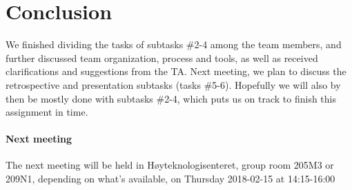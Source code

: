 \documentclass{article}
\begin{document}
\section{Conclusion}

We finished dividing the tasks of subtasks \#2-4 among the team members, and further discussed team organization, process and tools, as well as received clarifications and suggestions from the TA. Next meeting, we plan to discuss the retrospective and presentation subtasks (tasks \#5-6). Hopefully we will also by then be mostly done with subtasks \#2-4, which puts us on track to finish this assignment in time.

\paragraph{Next meeting}

The next meeting will be held in Høyteknologisenteret, group room 205M3 or 209N1, depending on what's available, on Thursday 2018-02-15 at 14:15-16:00
\end{document}
